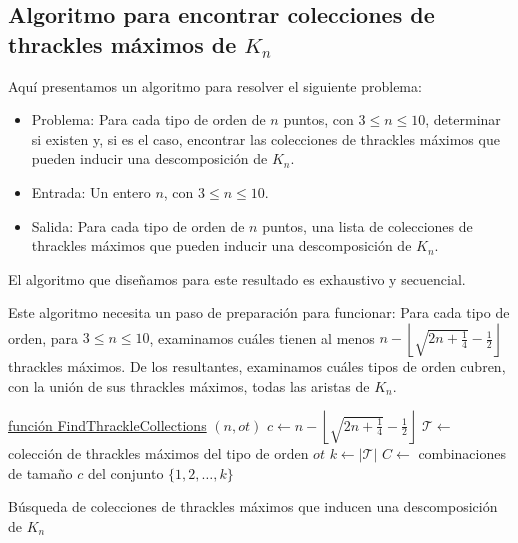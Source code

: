 \subsection{Algoritmo para encontrar colecciones de thrackles máximos de $K_n$} \label{secc:algo_descomposicion_thrackles_maximos}
  Aquí presentamos un algoritmo para resolver el siguiente problema:
  \begin{itemize}
    \item[] Problema: Para cada tipo de orden de $n$ puntos, con $3 \leq n \leq 10$, determinar si existen y, si es el caso, encontrar las colecciones de thrackles máximos que pueden inducir una descomposición de $K_n$.
    \item[] Entrada: Un entero $n$, con $ 3 \leq n \leq 10$.
    \item[] Salida: Para cada tipo de orden de $n$ puntos, una lista de colecciones de thrackles máximos que pueden inducir una descomposición de $K_n$.
  \end{itemize}

  El algoritmo que diseñamos para este resultado es exhaustivo y secuencial.

  Este algoritmo necesita un paso de preparación para funcionar: Para cada tipo de orden,
  para $3\leq n \leq 10$, examinamos cuáles tienen al menos $n - \left\lfloor\sqrt{2n +
  \frac{1}{4}} - \frac{1}{2}\right\rfloor$ thrackles máximos. De los resultantes,
  examinamos cuáles tipos de orden cubren, con la unión de sus thrackles máximos, todas
  las aristas de $K_n$.

  \begin{algorithm}[t]
    \DontPrintSemicolon
    \underline{función FindThrackleCollections} $(n,ot)$\;
    $c \gets n - \left\lfloor\sqrt{2n + \frac{1}{4}} - \frac{1}{2}\right\rfloor$\;
    $\mathcal{T} \gets $ colección de thrackles máximos del tipo de orden $ot$\;
    $k \gets |\mathcal{T}|$\;
    $C \gets $ combinaciones de tamaño $c$ del conjunto $\{1,2,\dots,k\}$\;
    \caption{Búsqueda de colecciones de thrackles máximos que inducen una descomposición
    de $K_n$}
    \label{algo:descomposicion_thrackles_maximos}
  \end{algorithm}

